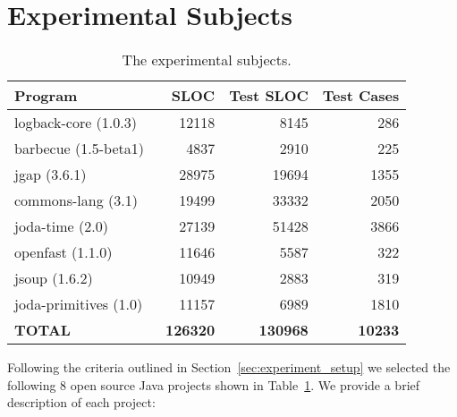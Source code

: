 \section{Experimental Subjects}
\label{sec:experiment_subjects}
\begin{table}[!t]
  \centering
  \begin{tabular}{|l|r|r|r|}
    \hline
    \rowcolor[RGB]{169,196,223}
    \textbf{Program} & \textbf{SLOC} & \textbf{Test SLOC} & \textbf{Test Cases} \\
    \hline logback-core (1.0.3)~\cite{logback} & 12118 & 8145 & 286 \\
    \hline barbecue (1.5-beta1)~\cite{barbecue} & 4837 & 2910 & 225 \\
    \hline jgap (3.6.1)~\cite{jgap} & 28975 & 19694 & 1355 \\
    \hline commons-lang (3.1)~\cite{commons-lang} & 19499 & 33332 & 2050 \\
    \hline joda-time (2.0)~\cite{joda-time} & 27139 & 51428 & 3866 \\
    \hline openfast (1.1.0)~\cite{openfast} & 11646 & 5587 & 322 \\
    \hline jsoup (1.6.2)~\cite{jsoup} & 10949 & 2883 & 319 \\
    \hline joda-primitives (1.0)~\cite{joda-primitives} & 11157 & 6989 & 1810 \\
    \hline \textbf{TOTAL} & \textbf{126320} & \textbf{130968} & \textbf{10233} \\
    \hline
  \end{tabular}
  \caption{The experimental subjects.}
  \vspace{1mm}
  \footnotesize{\emph{}}
  \vspace{1mm}
  \label{tab:experimental_subjects}
\end{table}

Following the criteria outlined in Section~\ref{sec:experiment_setup} we selected the following 8 open source Java projects shown in Table~\ref{tab:experimental_subjects}. We provide a brief description of each project:

